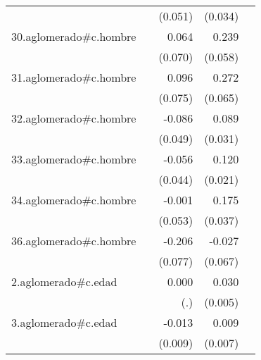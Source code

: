 {\begin{longtable}{l*{4}{D{.}{.}{-1}}}
            &                     &     (0.051)         &     (0.034)         &                     \\
\addlinespace
30.aglomerado#c.hombre&                     &       0.064         &       0.239\sym{***}&                     \\
            &                     &     (0.070)         &     (0.058)         &                     \\
\addlinespace
31.aglomerado#c.hombre&                     &       0.096         &       0.272\sym{***}&                     \\
            &                     &     (0.075)         &     (0.065)         &                     \\
\addlinespace
32.aglomerado#c.hombre&                     &      -0.086         &       0.089\sym{**} &                     \\
            &                     &     (0.049)         &     (0.031)         &                     \\
\addlinespace
33.aglomerado#c.hombre&                     &      -0.056         &       0.120\sym{***}&                     \\
            &                     &     (0.044)         &     (0.021)         &                     \\
\addlinespace
34.aglomerado#c.hombre&                     &      -0.001         &       0.175\sym{***}&                     \\
            &                     &     (0.053)         &     (0.037)         &                     \\
\addlinespace
36.aglomerado#c.hombre&                     &      -0.206\sym{**} &      -0.027         &                     \\
            &                     &     (0.077)         &     (0.067)         &                     \\
\addlinespace
2.aglomerado#c.edad&                     &       0.000         &       0.030\sym{***}&                     \\
            &                     &         (.)         &     (0.005)         &                     \\
\addlinespace
3.aglomerado#c.edad&                     &      -0.013         &       0.009         &                     \\
            &                     &     (0.009)         &     (0.007)         &                     \\

\end{longtable}}
